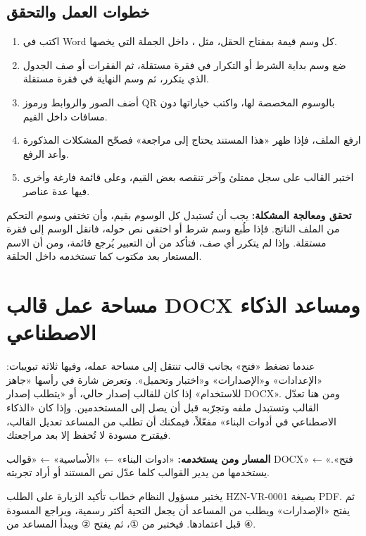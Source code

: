 \subsection{خطوات العمل والتحقق}
\begin{enumerate}
\item اكتب في Word كل وسم قيمة بمفتاح الحقل، مثل ، داخل الجملة التي يخصها.
\item ضع وسم بداية الشرط أو التكرار في فقرة مستقلة، ثم الفقرات أو صف الجدول الذي يتكرر، ثم وسم النهاية في فقرة مستقلة.
\item أضف الصور والروابط ورموز QR بالوسوم المخصصة لها، واكتب خياراتها دون مسافات داخل القيم.
\item ارفع الملف، فإذا ظهر «هذا المستند يحتاج إلى مراجعة» فصحّح المشكلات المذكورة وأعد الرفع.
\item اختبر القالب على سجل ممتلئ وآخر تنقصه بعض القيم، وعلى قائمة فارغة وأخرى فيها عدة عناصر.
\end{enumerate}

\textbf{تحقق ومعالجة المشكلة:} يجب أن تُستبدل كل الوسوم بقيم، وأن تختفي وسوم التحكم من الملف الناتج. فإذا طُبع وسم شرط أو اختفى نص حوله، فانقل الوسم إلى فقرة مستقلة. وإذا لم يتكرر أي صف، فتأكد من أن التعبير يُرجع قائمة، ومن أن الاسم المستعار بعد  مكتوب كما تستخدمه داخل الحلقة.

\clearpage
\section{مساحة عمل قالب DOCX ومساعد الذكاء الاصطناعي}
\label{sec:builder-feature-docx-workspace}

عندما تضغط «فتح» بجانب قالب تنتقل إلى مساحة عمله، وفيها ثلاثة تبويبات: «الإعدادات» و«الإصدارات» و«اختبار وتحميل». وتعرض شارة في رأسها «جاهز للاستخدام» إذا كان للقالب إصدار حالي، أو «يتطلب إصدار DOCX». ومن هنا تعدّل القالب وتستبدل ملفه وتجرّبه قبل أن يصل إلى المستخدمين. وإذا كان «الذكاء الاصطناعي في أدوات البناء» مفعّلاً، فيمكنك أن تطلب من المساعد تعديل القالب، فيقترح مسودة لا تُحفظ إلا بعد مراجعتك.

\textbf{المسار ومن يستخدمه:} «ادوات البناء» ← «الأساسية» ← «قوالب DOCX» ← «فتح». يستخدمها من يدير القوالب كلما عدّل نص المستند أو أراد تجربته.

\begin{rcnote}
يختبر مسؤول النظام خطاب تأكيد الزيارة على الطلب HZN-VR-0001 بصيغة PDF. ثم يفتح «الإصدارات» ويطلب من المساعد أن يجعل التحية أكثر رسمية، ويراجع المسودة قبل اعتمادها. فيختبر من ①، ثم يفتح ② ويبدأ المساعد من ④.
\end{rcnote}

